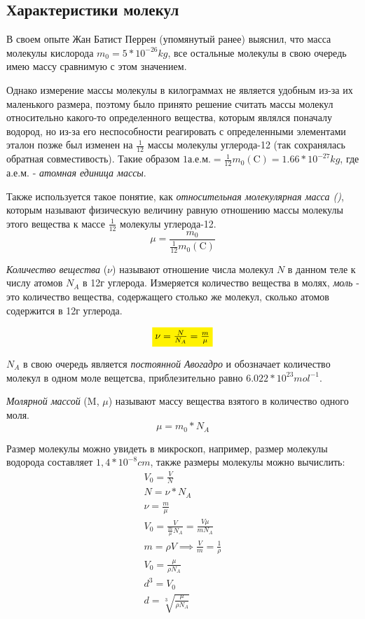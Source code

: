 \documentclass{article}
\begin{document}
\subsection{Характеристики молекул}

В своем опыте Жан Батист Перрен (упомянутый ранее) выяснил, что масса молекулы кислорода $m_0 = 5 * 10^{-26} \si{kg}$,
все остальные молекулы в свою очередь имею массу сравнимую с этом значением. 

Однако измерение массы молекулы в
килограммах не является удобным из-за их маленького размера, поэтому было принято решение считать массы молекул
относительно какого-то определенного вещества, которым являлся поначалу водород, но из-за его неспособности реагировать
с определенными элементами эталон позже был изменен на $\frac{1}{12}$ массы молекулы углерода-12 (так сохранялась 
обратная совместивость). Такие образом $1 \text{а.е.м.} = \frac{1}{12}m_0(\text{C}) = 1.66 * 10^{-27} \si{kg}$, 
где а.е.м. - \textit{атомная единица массы}.

Также используется такое понятие, как \textit{относительная молекулярная масса (\textmu)}, которым называют физическую величину
равную отношению массы молекулы этого вещества к массе $\frac{1}{12}$ молекулы углерода-12.
\[
  \mu = \frac{m_0}{\frac{1}{12}m_0(\text{C})}
\]

\textit{Количество вещества} ($\nu$) называют отношение числа молекул $N$ в данном теле к числу атомов $N_A$ в 12г углерода. 
Измеряется количество вещества в молях, \textit{моль} - это количество вещества, содержащего столько же молекул, 
сколько атомов содержится в 12г углерода. 

\begin{align*}
  \colorbox{yellow}{$\nu = \frac{N}{N_{A}} = \frac{m}{\mu}$}
\end{align*}

$N_A$ в свою очередь является \textit{постоянной Авогадро} и обозначает количество молекул в одном моле вещетсва, приблезительно
равно $6.022 * 10^{23} \si{mol^{-1}}$. 

\textit{Молярной массой} ($\text{M}$, $\mu$) называют массу вещества взятого в количество одного моля. 
\[
  \mu = {m_0} * {N_A}
\]

Размер молекулы можно увидеть в микроскоп, например, размер молекулы водорода составляет $1,4 * 10^{-8} \si{cm}$, 
также размеры молекулы можно вычислить:
\begin{gather*}
  V_0 = \frac{V}{N} \\
  N = \nu * N_A \\
  \nu = \frac{m}{\mu} \\
  V_0 = \frac{V}{\frac{m}{\mu}N_A} = \frac{V\mu}{mN_A}\\ 
  m = \rho V \implies \frac{V}{m} = \frac{1}{\rho} \\
  V_0 = \frac{\mu}{\rho N_A} \\
  d^3 = V_0 \\
  d = \sqrt[3]{\frac{\mu}{\rho N_A}}
\end{gather*}
\end{document}
